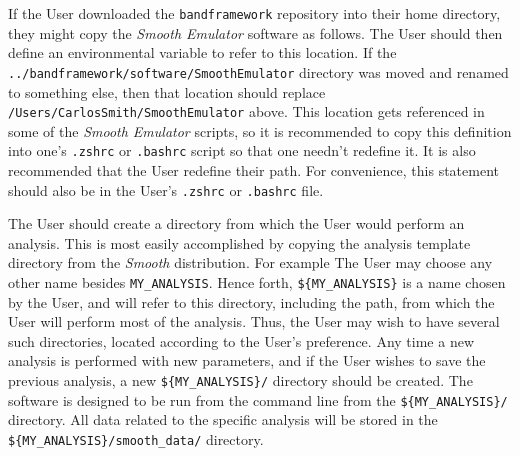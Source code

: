 \documentclass[UserManual.tex]{subfiles}
\begin{document}
If the User downloaded the {\tt bandframework} repository into their home directory, they might copy the {\it Smooth Emulator} software as follows.
\vspace*{-8pt}{\tt \begin{Verbatim}[commandchars=\\\{\}]
/Users/CarlosSmith% \textcolor{darkred}{cp -r bandframework/software/SmoothEmulator ./SmoothEmulator}
\end{Verbatim}
}\vspace*{-8pt}
The User should then define an environmental variable to refer to this location. 
\vspace*{-8pt}{\tt \begin{Verbatim}[commandchars=\\\{\}]
% \textcolor{darkred}{export SMOOTH_HOME=/Users/CarlosSmith/SmoothEmulator}
\end{Verbatim}
}\vspace*{-8pt}
If the {\tt ../bandframework/software/SmoothEmulator} directory was moved and renamed to something else, then that location should replace {\tt /Users/CarlosSmith/SmoothEmulator} above. This location gets referenced in some of the {\it Smooth Emulator} scripts, so it is recommended to copy this definition into one's {\tt .zshrc} or {\tt .bashrc} script so that one needn't redefine it. It is also recommended that the User redefine their path. For convenience, this statement should also be in the User's {\tt .zshrc} or {\tt .bashrc} file.
\vspace*{-8pt}{\tt \begin{Verbatim}[commandchars=\\\{\}]
% \textcolor{darkred}{export PATH=${PATH}:$\{SMOOTH_HOME\}/bin}
\end{Verbatim}
}\vspace*{-8pt}

The User should create a directory from which the User would perform an analysis. This is most easily accomplished by copying the analysis template directory from the {\it Smooth} distribution. For example
\vspace*{-8pt}{\tt \begin{Verbatim}[commandchars=\\\{\}]
% \textcolor{darkred}{cp -r $\{SMOOTH_HOME\}/AnalysisTemplate /Users/CarlosSmith/MY_ANALYSIS}
\end{Verbatim}
}\vspace*{-8pt}
The User may choose any other name besides {\tt MY\_ANALYSIS}. Hence forth, {\tt \$\{MY\_ANALYSIS\}} is a name chosen by the User, and will refer to this directory, including the path, from which the User will perform most of the analysis. Thus, the User may wish to have several such directories, located according to the User's preference. Any time a new analysis is performed with new parameters, and if the User wishes to save the previous analysis, a new {\tt \$\{MY\_ANALYSIS\}/} directory should be created. The software is designed to be run from the command line from the {\tt \$\{MY\_ANALYSIS\}/} directory. All data related to the specific analysis will be stored in the {\tt \$\{MY\_ANALYSIS\}/smooth\_data/} directory.
\end{document}
